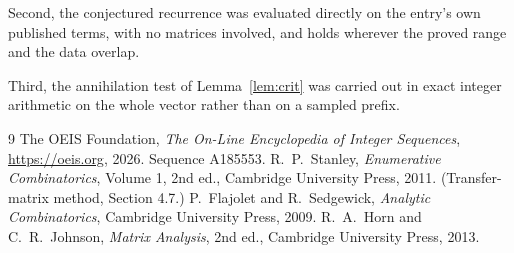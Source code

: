 \documentclass[11pt,a4paper]{article}
\theoremstyle{plain}
\theoremstyle{definition}
\begin{document}
Second, the conjectured recurrence was evaluated directly on the entry's own published terms,
with no matrices involved, and holds wherever the proved range and the data overlap.

Third, the annihilation test of Lemma~\ref{lem:crit} was carried out in exact integer
arithmetic on the whole vector rather than on a sampled prefix.

\begin{thebibliography}{9}
 The OEIS Foundation, \emph{The On-Line Encyclopedia of Integer
Sequences}, \url{https://oeis.org}, 2026. Sequence A185553.
 R.~P.~Stanley, \emph{Enumerative Combinatorics}, Volume 1, 2nd ed.,
Cambridge University Press, 2011. (Transfer-matrix method, Section 4.7.)
 P.~Flajolet and R.~Sedgewick, \emph{Analytic Combinatorics}, Cambridge
University Press, 2009.
 R.~A.~Horn and C.~R.~Johnson, \emph{Matrix Analysis}, 2nd ed., Cambridge
University Press, 2013.
\end{thebibliography}
\end{document}

